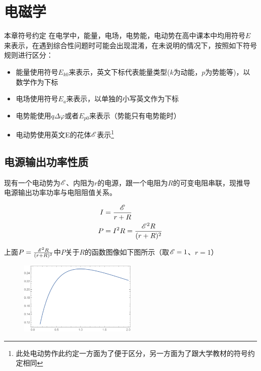 
\chapter{电磁学}

\begin{mk}{本章符号约定}{}
在电学中，能量，电场，电势能，电动势在高中课本中均用符号$E$来表示，在遇到综合性问题时可能会出现混淆，在未说明的情况下，按照如下符号规则进行区分：

\begin{itemize}
\item 能量使用符号$E_{k0}$来表示，英文下标代表能量类型($k$为动能，$p$为势能等)，以数学作为下标
\item 电场使用符号$E_a$来表示，以单独的小写英文作为下标
\item 电势能使用$q \Delta \varphi$或者$E_{p0}$来表示（势能只有电势能时）
\item 电动势使用英文E的花体$\mathscr{E}$表示\footnote{此处电动势作此约定一方面为了便于区分，另一方面为了跟大学教材的符号约定相同}
\end{itemize}
\end{mk}

\section{电源输出功率性质}
\label{s_wdlzdgl}

现有一个电动势为$\mathscr{E}$、内阻为$r$的电源，跟一个电阻为$R$的可变电阻串联，现推导电源输出功率功率与电阻阻值关系。

\begin{subequations}
\begin{align*}
I &= \frac{\mathscr{E}}{r + R} \\
P &= I^2 R = \frac{\mathscr{E}^2 R}{(r + R)^2}
\end{align*}
\end{subequations}

上面$P = \frac{\mathscr{E}^2 R}{(r + R)^2}$中$P$关于$R$的函数图像如下图所示（取$\mathscr{E} = 1$、$r = 1$）

\begin{figure}[htbp]
\centering
\includegraphics[width=0.5\textwidth]{pic_eled/zdgl_p1.pdf}
\end{figure}

